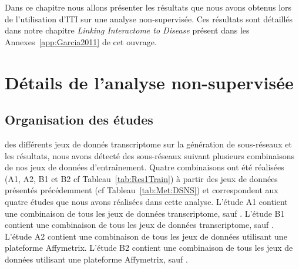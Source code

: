 \singlespacing

\label{chap:results1}
		\begin{center}
			\begin{tcolorbox}[colback=green!5!white,colframe=green!45!black,arc=0mm]
				\sffamily
				Dans ce chapitre nous allons présenter les résultats que nous avons obtenus lors de l'utilisation d'ITI sur une analyse non-supervisée.
				Ces résultats sont détaillés dans notre chapitre \emph{Linking Interactome to Disease} \citet{Garcia2011} présent dans les Annexes~\ref{app:Garcia2011} de cet ouvrage.
			\end{tcolorbox}
			\vspace{5ex}
			\minitoc
		\end{center}
		\newpage

\doublespacing

	\section{\textcolor{green!45!black}{Détails de l'analyse non-supervisée}}
		\subsection{\textcolor{green!45!black}{Organisation des études}}
		 des différents jeux de donnés transcriptome sur la génération de sous-réseaux et les résultats, nous avons détecté des sous-réseaux suivant plusieurs combinaisons de nos jeux de données d'entraînement.
		Quatre combinaisons ont été réalisées (A1, A2, B1 et B2 cf Tableau~\ref{tab:Res1Train}) à partir des jeux de données présentés précédemment (cf Tableau~\ref{tab:Met:DSNS}) et correspondent aux quatre études que nous avons réalisées dans cette analyse.
		L'étude A1 contient une combinaison de tous les jeux de données transcriptome, sauf \citet{vandevijver2002}.
		L'étude B1 contient une combinaison de tous les jeux de données transcriptome, sauf \citet{Wang2005}.
		L'étude A2 contient une combinaison de tous les jeux de données utilisant une plateforme Affymetrix.
		L'étude B2 contient une combinaison de tous les jeux de données utilisant une plateforme Affymetrix, sauf \citet{Wang2005}.

